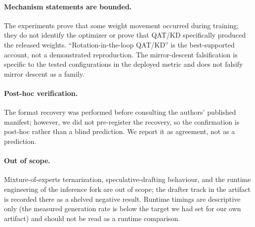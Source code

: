 \paragraph{Mechanism statements are bounded.}
The experiments prove that some weight movement occurred during training; they
do not identify the optimizer or prove that QAT/KD specifically produced the
released weights. ``Rotation-in-the-loop QAT/KD'' is the best-supported
account, not a demonstrated reproduction. The mirror-descent falsification is
specific to the tested configurations in the deployed metric and does not
falsify mirror descent as a family.

\paragraph{Post-hoc verification.}
The format recovery was performed before consulting the authors' published
manifest; however, we did not pre-register the recovery, so the confirmation is
post-hoc rather than a blind prediction. We report it as agreement, not as a
prediction.

\paragraph{Out of scope.}
Mixture-of-experts ternarization, speculative-drafting behaviour, and the
runtime engineering of the inference fork are out of scope; the drafter track
in the artifact is recorded there as a shelved negative result. Runtime
timings are descriptive only (the measured generation rate is below the target
we had set for our own artifact) and should not be read as a runtime
comparison.
